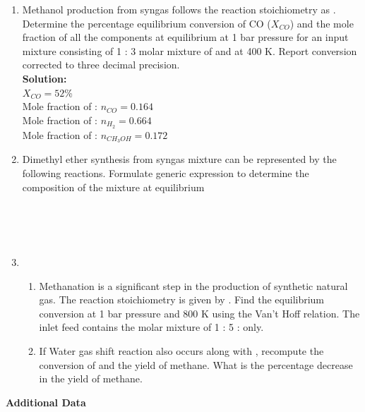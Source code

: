 \documentclass[a4paper,10pt]{article}
\begin{document}
\begin{enumerate}
    \item Methanol production from syngas follows the reaction stoichiometry as . Determine the percentage equilibrium conversion of CO ($X_{CO}$) and the mole fraction of all the components at equilibrium at 1 bar pressure for an input mixture consisting of 1 : 3 molar mixture of  and  at 400 K. Report conversion corrected to three decimal precision.\\[3 mm]
    \textbf{Solution: }\\$X_{CO}=52$\%\\
    Mole fraction of : $n_{CO} = 0.164$\\
    Mole fraction of : $n_{H_2} = 0.664$\\
    Mole fraction of : $n_{CH_3OH} = 0.172$

    \item Dimethyl ether synthesis from syngas mixture can be represented by the following reactions. Formulate generic expression to determine the composition of the mixture at equilibrium\\[2 mm]
    \begin{center}
        \\[1 mm]
        \\[1 mm]
        \\[1 mm]
    \end{center}
    
    \item   \begin{enumerate}[label=(\alph*)]
                \item {} Methanation is a significant step in the production of synthetic natural gas. The reaction stoichiometry is given by . Find the equilibrium conversion at 1 bar pressure and 800 K using the Van’t Hoff relation. The inlet feed contains the molar mixture of 1 : 5  :  only.
                
                \item If Water gas shift reaction also occurs along with , recompute the conversion of  and the yield of methane. What is the percentage decrease in the yield of methane.
            \end{enumerate}
\end{enumerate}
\vspace{3 mm} \textbf{Additional Data}\\
\end{document}
